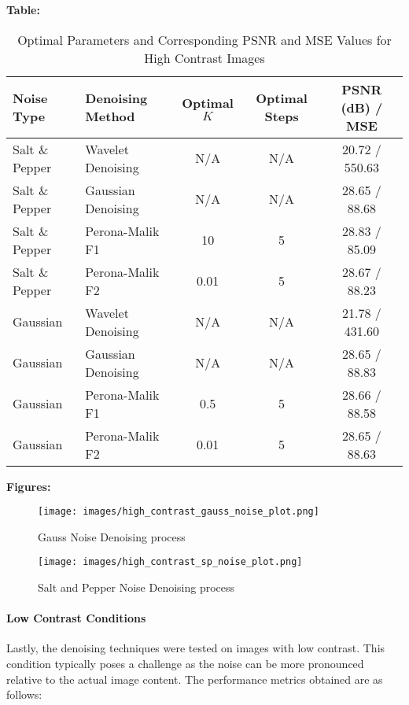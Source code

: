 \documentclass{article}
\begin{document}
\textbf{Table:}

\begin{table}[H]
\centering
\caption{Optimal Parameters and Corresponding PSNR and MSE Values for High Contrast Images}
\label{tab:optimal_high_contrast_parameters}
\begin{tabular}{llccc}
\hline
Noise Type & Denoising Method & Optimal \( K \) & Optimal Steps & PSNR (dB) / MSE \\ \hline
Salt \& Pepper & Wavelet Denoising & N/A & N/A & 20.72 / 550.63 \\
Salt \& Pepper & Gaussian Denoising & N/A & N/A & 28.65 / 88.68 \\
Salt \& Pepper & Perona-Malik F1 & 10 & 5 & 28.83 / 85.09 \\
Salt \& Pepper & Perona-Malik F2 & 0.01 & 5 & 28.67 / 88.23 \\
Gaussian & Wavelet Denoising & N/A & N/A & 21.78 / 431.60 \\
Gaussian & Gaussian Denoising & N/A & N/A & 28.65 / 88.83 \\
Gaussian & Perona-Malik F1 & 0.5 & 5 & 28.66 / 88.58 \\
Gaussian & Perona-Malik F2 & 0.01 & 5 & 28.65 / 88.63 \\ \hline
\end{tabular}
\end{table}


\textbf{Figures:} 

\begin{figure}[H]
    \centering
    \texttt{[image: images/high\_contrast\_gauss\_noise\_plot.png]}
    \caption{Gauss Noise Denoising process}
    \label{fig:denoising_3}
\end{figure}

\begin{figure}[H]
    \centering
    \texttt{[image: images/high\_contrast\_sp\_noise\_plot.png]}
    \caption{Salt and Pepper Noise Denoising process}
    \label{fig:denoising_4}
\end{figure}

\paragraph{Low Contrast Conditions}
Lastly, the denoising techniques were tested on images with low contrast. This condition typically poses a challenge as the noise can be more pronounced relative to the actual image content. The performance metrics obtained are as follows:
\end{document}
